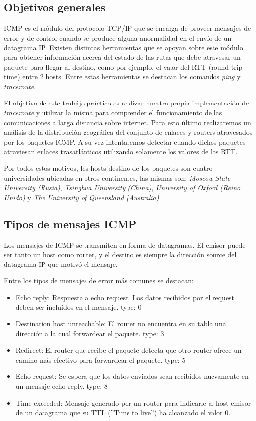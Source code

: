 \subsection{Objetivos generales}

ICMP es el m\'odulo del protocolo TCP/IP que se encarga de proveer mensajes de error y de control cuando
se produce alguna anormalidad en el env\'io de un datagrama IP. Existen distintas herramientas
que se apoyan sobre este m\'odulo para obtener informaci\'on acerca del estado de las rutas que
debe atravesar un paquete para llegar al destino, como por ejemplo, el valor del RTT (round-trip-time)
entre 2 hosts. Entre estas herramientas se destacan los comandos \emph{ping} y \emph{traceroute}.

El objetivo de este trab\'ajo pr\'actico es realizar nuestra propia
implementaci\'on de \emph{traceroute} y utilizar la misma para comprender el
funcionamiento de las comunicaciones a larga distancia sobre internet.
Para esto \'ultimo realizaremos un an\'alisis de la distribuci\'on
geogr\'afica del conjunto de enlaces y routers atravesados por los paquetes
ICMP.
A su vez intentaremos detectar cuando dichos paquetes atraviesan enlaces
trasatl\'anticos utilizando solamente los valores de los RTT.

Por todos estos motivos, los hosts destino de los paquetes son cuatro universidades ubicadas en
otros continentes, las mismas son: \emph{Moscow State University (Rusia)}, \emph{Tsinghua University (China)},
\emph{University of Oxford (Reino Unido)} y \emph{The University of Queensland (Australia)}


\subsection{Tipos de mensajes ICMP}

Los mensajes de ICMP se transmiten en forma de datagramas. El emisor puede ser tanto un host como router,
y el destino es siempre la direcci\'on source del datagrama IP que motiv\'o el mensaje.

Entre los tipos de mensajes de error m\'as comunes se destacan:
\begin{itemize}
  \item Echo reply: Respuesta a echo request. Los datos recibidos por el request deben ser inclu\'idos
  en el mensaje. type: 0
  \item Destination host unreachable: El router no encuentra en su tabla una direcci\'on a la cual
  forwardear el paquete. type: 3
  \item Redirect: El router que recibe el paquete detecta que otro router ofrece un camino m\'as
  efectivo para forwardear el paquete. type: 5
  \item Echo request: Se espera que los datos enviados sean recibidos nuevamente en un mensaje echo
  reply. type: 8
  \item Time exceeded: Mensaje generado por un router para indicarle al host emisor de un datagrama
  que su TTL (''Time to live'') ha alcanzado el valor 0.

\end{itemize}


